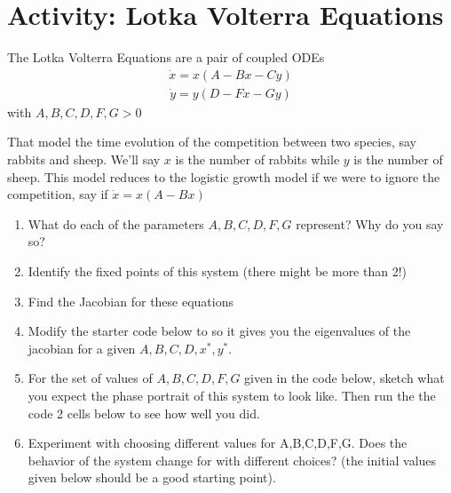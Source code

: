 \documentclass[letterpaper,10pt,english]{jupyterBook}
\begin{document}
\section{Activity: Lotka \sphinxhyphen{} Volterra Equations}
\label{\detokenize{content/1_mechanics/dynamical_2:activity-lotka-volterra-equations}}
\sphinxAtStartPar
The Lotka \sphinxhyphen{}Volterra Equations are a pair of coupled ODEs
\begin{equation*}
\begin{split}\dot{x}= x(A − Bx - Cy)\end{split}
\end{equation*}\begin{equation*}
\begin{split}\dot{y}= y(D - Fx - Gy)\end{split}
\end{equation*}
\sphinxAtStartPar
with \(A,B,C,D,F,G > 0\)

\sphinxAtStartPar
That model the time evolution of the competition between two species, say rabbits and sheep. We’ll say \(x\) is the number of rabbits while \(y\) is the number of sheep. This model reduces to the logistic growth model if we were to ignore the competition, say if \(\dot{x}= x(A − Bx)\)

\sphinxAtStartPar
{}
\begin{enumerate}
%
\item {} 
\sphinxAtStartPar
What do each of the parameters \(A,B,C,D,F,G\) represent? Why do you say so?

\item {} 
\sphinxAtStartPar
Identify the fixed points of this system (there might be more than 2!)

\item {} 
\sphinxAtStartPar
Find the Jacobian for these equations

\item {} 
\sphinxAtStartPar
Modify the starter code below to so it gives you the eigenvalues of the jacobian for a given \(A,B,C,D,x^*,y^*\).

\item {} 
\sphinxAtStartPar
For the set of values of \(A,B,C,D,F,G\) given in the code below, sketch what you expect the phase portrait of this system to look like. Then run the the code 2 cells below to see how well you did.

\item {} 
\sphinxAtStartPar
Experiment with choosing different values for A,B,C,D,F,G. Does the behavior of the system change for with different choices? (the initial values given below should be a good starting point).

\end{enumerate}
\end{document}

